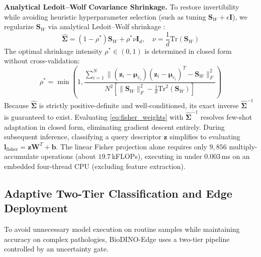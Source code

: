 \documentclass[conference]{IEEEtran}
\begin{document}
\medskip
\textbf{Analytical Ledoit--Wolf Covariance Shrinkage.} To restore invertibility while avoiding heuristic hyperparameter selection (such as tuning $\mathbf{S}_W + \epsilon \mathbf{I}$), we regularize $\mathbf{S}_W$ via analytical Ledoit--Wolf shrinkage \cite{ledoit2004well}:
\begin{equation}
    \hat{\mathbf{\Sigma}} = (1 - \rho^*)\mathbf{S}_W + \rho^* \nu \mathbf{I}_{d}, \quad \nu = \frac{1}{d}\text{Tr}(\mathbf{S}_W)
\end{equation}
The optimal shrinkage intensity $\rho^* \in (0, 1)$ is determined in closed form without cross-validation:
\begin{equation}
    \rho^* = \min\left(1, \frac{\sum_{i=1}^N \|(\mathbf{z}_i - \boldsymbol{\mu}_{c_i})(\mathbf{z}_i - \boldsymbol{\mu}_{c_i})^T - \mathbf{S}_W\|_F^2}{N^2 \left[\|\mathbf{S}_W\|_F^2 - \frac{1}{d}\text{Tr}^2(\mathbf{S}_W)\right]}\right)
\end{equation}
Because $\hat{\mathbf{\Sigma}}$ is strictly positive-definite and well-conditioned, its exact inverse $\hat{\mathbf{\Sigma}}^{-1}$ is guaranteed to exist. Evaluating \eqref{eq:fisher_weights} with $\hat{\mathbf{\Sigma}}^{-1}$ resolves few-shot adaptation in closed form, eliminating gradient descent entirely. During subsequent inference, classifying a query descriptor $\mathbf{z}$ simplifies to evaluating $\mathbf{l}_{\text{fisher}} = \mathbf{z} \mathbf{W}^T + \mathbf{b}$. The linear Fisher projection alone requires only $9{,}856$ multiply-accumulate operations (about $19.7$\,kFLOPs), executing in under $0.003$\,ms on an embedded four-thread CPU (excluding feature extraction).

\subsection{Adaptive Two-Tier Classification and Edge Deployment}
\label{sec:edge_deployment}
To avoid unnecessary model execution on routine samples while maintaining accuracy on complex pathologies, BioDINO-Edge uses a two-tier pipeline controlled by an uncertainty gate.
\end{document}
